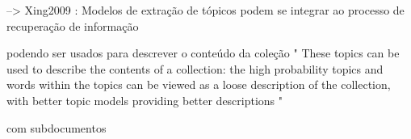 --> Xing2009 :
Modelos de extração de tópicos podem se integrar ao processo de recuperação de informação

podendo ser usados para descrever o conteúdo da coleção
" These topics can be used to describe the contents of a collection: the high probability topics and words within the topics can be viewed as a loose description of the collection, with better topic models providing better descriptions "









com subdocumentos 












